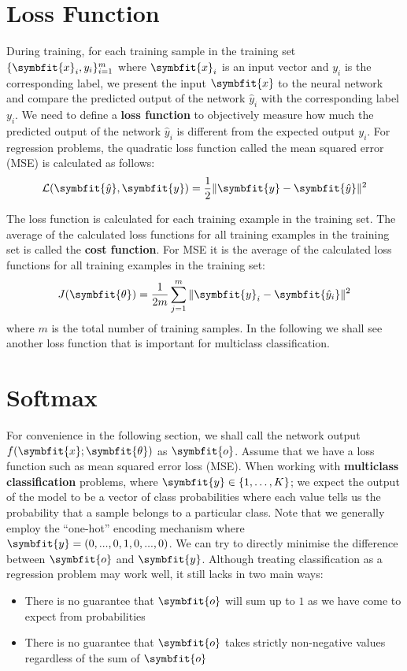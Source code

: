 \section{Loss Function}\label{sec:loss-fn}
During training, for each training sample in the training set $\{\symbfit{x}_i, y_i\}_{i=1}^m$ where $\symbfit{x}_i$ is an input vector and $y_i$ is the corresponding label, we present the input $\symbfit{x}$ to the neural network and compare the predicted output of the network $\hat{y}_i$ with the corresponding label $y_i$.
We need to define a \textbf{loss function} to objectively measure how much the predicted output of the network $\hat{y}_i$ is different from the expected output $y_i$. For regression problems, the quadratic loss function called the mean squared error (MSE) is calculated as follows:
\begin{equation}
    \mathcal{L}(\symbfit{\hat{y}}, \symbfit{y}) = \frac{1}{2} \| \symbfit{y} - \symbfit{\hat{y}} \| ^ 2
\end{equation}

The loss function is calculated for each training example in the training set. The average of the calculated loss functions for all training examples in the training set is called the \textbf{cost function}. For MSE it is the average of the calculated loss functions for all training examples in the training set:
\begin{equation}
    J(\symbfit{\theta}) = \frac{1}{2m} \sum_{j=1}^{m} \| \symbfit{y}_i - \symbfit{\hat{y}_i} \| ^ 2
\end{equation}
where $m$ is the total number of training samples. In the following  we shall see another loss function that is important for multiclass classification.

\section{Softmax} \label{sec:softmax}
For convenience in the following section, we shall call the network output $f(\symbfit{x}; \symbfit{\theta})$ as $\symbfit{o}$. Assume that we have a loss function such as mean squared error loss (MSE). When working with \textbf{multiclass classification} problems, where \(\symbfit{y} \in \left\{1,\ldots, K \right\}\); we expect the output of the model to be a vector of class probabilities where each value tells us the probability that a sample belongs to a particular class.
Note that we generally employ the ``one-hot'' encoding mechanism where $\symbfit{y} = (0, ... , 0, 1, 0, ... , 0)$.
We can try to directly minimise the difference between $\symbfit{o}$ and $\symbfit{y}$. Although treating classification as a regression problem may work well, it still lacks in two main ways:
\begin{itemize}
    \item There is no guarantee that $\symbfit{o}$ will sum up to $1$ as we have come to expect from probabilities
    \item There is no guarantee that $\symbfit{o}$ takes strictly non-negative values regardless of the sum of $\symbfit{o}$
\end{itemize}

